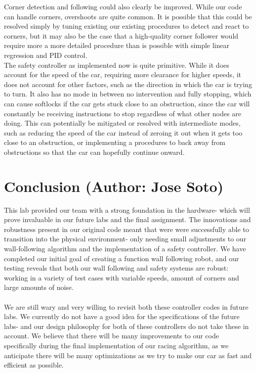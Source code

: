 \documentclass{article}
\begin{document}
Corner detection and following could also clearly be improved. While our code can handle corners, overshoots are quite common. It is possible that this could be resolved simply by tuning existing our existing procedures to detect and react to corners, but it may also be the case that a high-quality corner follower would require more a more detailed procedure than is possible with simple linear regression and PID control. \\

The safety controller as implemented now is quite primitive. While it does account for the speed of the car, requiring more clearance for higher speeds, it does not account for other factors, such as the direction in which the car is trying to turn. It also has no mode in between no intervention and fully stopping, which can cause softlocks if the car gets stuck close to an obstruction, since the car will constantly be receiving instructions to stop regardless of what other nodes are doing. This can potentially be mitigated or resolved with intermediate modes, such as reducing the speed of the car instead of zeroing it out when it gets too close to an obstruction, or implementing a procedures to back away from obstructions so that the car can hopefully continue onward.

\section{Conclusion (Author: Jose Soto)}
This lab provided our team with a strong foundation in the hardware- which will prove invaluable in our future labs and the final assignment. The innovations and robustness present in our original code meant that were were successfully able to transition into the physical environment- only needing small adjustments to our wall-following algorithm and the implementation of a safety controller. We have completed our initial goal of creating a function wall following robot, and our testing reveals that both our wall following and safety systems are robust: working in a variety of test cases with variable speeds, amount of corners and large amounts of noise.   \\\\
We are still wary and very willing to revisit both these controller codes in future labs. We currently do not have a good idea for the specifications of the future labs- and our design philosophy for both of these controllers do not take these in account. We believe that there will be many improvements to our code specifically during the final implementation of our racing algorithm, as we anticipate there will be many optimizations as we try to make our car as fast and efficient as possible.  
\end{document}
